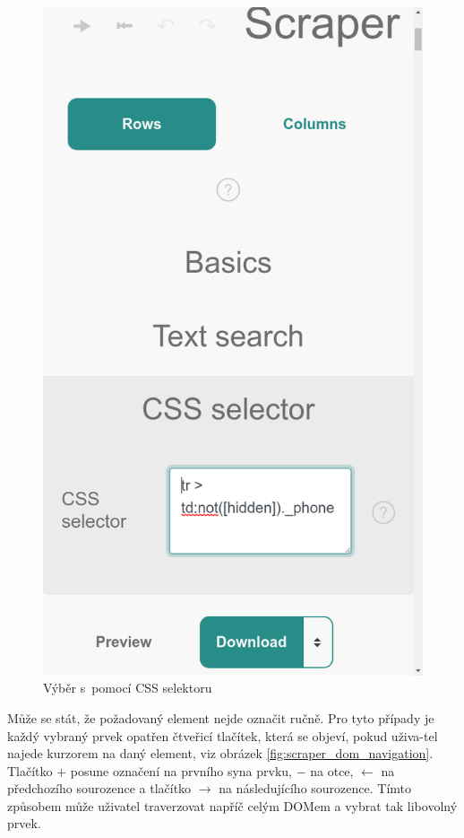 \documentclass[thesis=B,czech]{FITthesis}[2012/06/26]
\begin{document}
\begin{figure}
\begin{minipage}{.5\linewidth}
		\includegraphics[width=.75\linewidth]{images/Scraper_css_selector.png}
		\caption[Výběr s~pomocí CSS selektoru]{Výběr s~pomocí CSS \newline selektoru}
		\label{fig:scraper_css_selector}
	\end{minipage}
\end{figure}

\newpage
Může se stát, že požadovaný element nejde označit ručně. Pro tyto případy je každý vybraný prvek opatřen čtveřicí tlačítek, která se objeví, pokud uživa-tel najede kurzorem na daný element, viz obrázek \ref{fig:scraper_dom_navigation}. Tlačítko \textsf{$+$} posune označení na prvního syna prvku, \textsf{$-$} na otce, \textsf{$\leftarrow$} na předchozího sourozence a tlačítko \textsf{$\rightarrow$} na následujícího sourozence. Tímto způsobem může uživatel traverzovat napříč celým DOMem a vybrat tak libovolný prvek.
\end{document}
